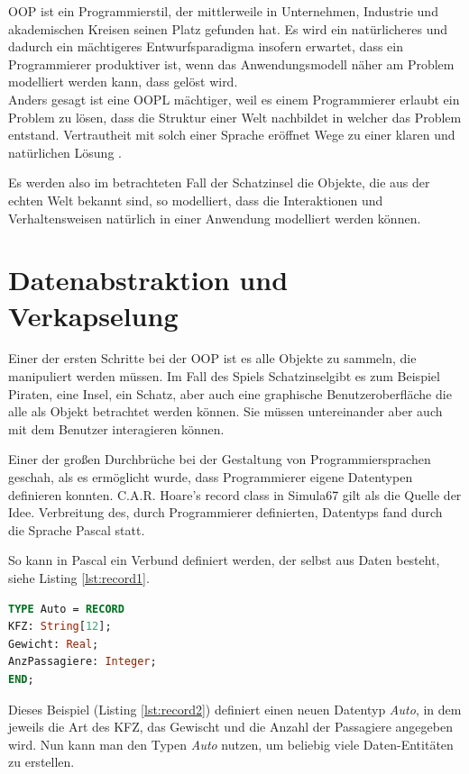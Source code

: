 \documentclass[
	12pt, %
	a4paper,
	listof=totoc, %
	bibliography=totoc, %
	numbers=noenddot, %
	ngerman, %
	headsepline, %
	oneside %
	]{scrbook} %
\begin{document}
\gls{OOP} ist ein Programmierstil, der mittlerweile in Unternehmen, Industrie und akademischen Kreisen seinen Platz gefunden hat. Es wird ein natürlicheres und dadurch ein mächtigeres Entwurfsparadigma insofern erwartet, dass ein Programmierer produktiver ist, wenn das Anwendungsmodell näher am Problem modelliert werden kann, dass gelöst wird.\\
Anders gesagt ist eine \gls{OOPL} mächtiger, weil es einem Programmierer erlaubt ein Problem zu lösen, dass die Struktur einer Welt nachbildet in welcher das Problem entstand. Vertrautheit mit solch einer Sprache eröffnet Wege zu einer klaren und natürlichen Lösung \cite{OOPL}.

Es werden also im betrachteten Fall der Schatzinsel die Objekte, die aus der echten Welt bekannt sind, so modelliert, dass die Interaktionen und Verhaltensweisen natürlich in einer Anwendung modelliert werden können.

\section{Datenabstraktion und Verkapselung}
Einer der ersten Schritte bei der \gls{OOP} ist es alle Objekte zu sammeln, die manipuliert werden müssen. Im Fall des Spiels \glqq Schatzinsel\grqq \hspace{0.1cm}gibt es zum Beispiel Piraten, eine Insel, ein Schatz, aber auch eine graphische Benutzeroberfläche die alle als Objekt betrachtet werden können. Sie müssen untereinander aber auch mit dem Benutzer interagieren können.

Einer der großen Durchbrüche bei der Gestaltung von Programmiersprachen geschah, als es ermöglicht wurde, dass Programmierer eigene Datentypen definieren konnten. C.A.R. Hoare's record class in Simula67 gilt als die Quelle der Idee.\cite{OOPL}
Verbreitung des, durch Programmierer definierten, Datentyps fand durch die Sprache Pascal statt. \cite{Pascal}

So kann in Pascal ein Verbund definiert werden, der selbst aus Daten besteht, siehe Listing \ref{lst:record1}. 

\begin{lstlisting}[language=Pascal, caption=Verbund Beispiel Definition \cite{PascalVerbund}, label={lst:record1}]
TYPE Auto = RECORD
KFZ: String[12];
Gewicht: Real;
AnzPassagiere: Integer;
END;
\end{lstlisting}

Dieses Beispiel (Listing \ref{lst:record2}) definiert einen neuen Datentyp \textit{Auto}, in dem jeweils die Art des KFZ, das Gewischt und die Anzahl der Passagiere angegeben wird. Nun kann man den Typen \textit{Auto} nutzen, um beliebig viele Daten-Entitäten zu erstellen.
\end{document}

